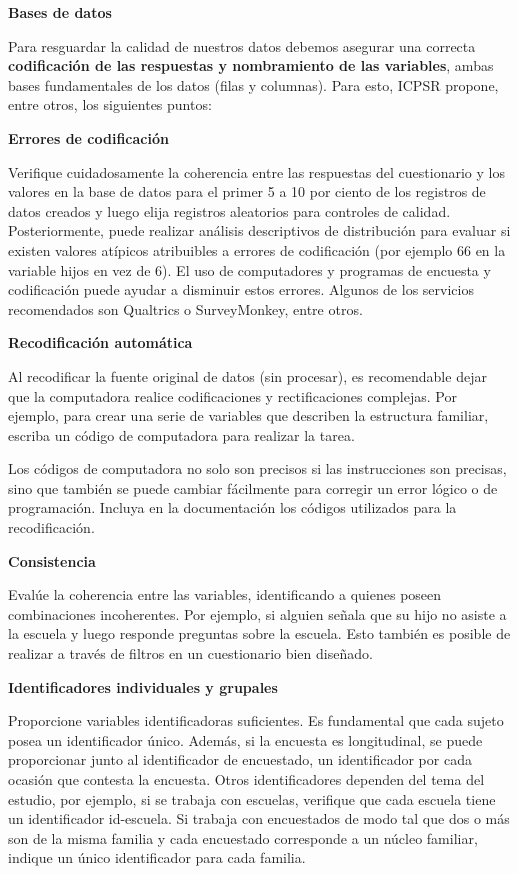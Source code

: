 \documentclass[
  spanish,
  letterpaper,
  DIV=11,
  numbers=noendperiod]{scrreprt}
\begin{document}
\textbf{Bases de datos}

Para resguardar la calidad de nuestros datos debemos asegurar una
correcta \textbf{codificación de las respuestas y nombramiento de las
variables}, ambas bases fundamentales de los datos (filas y columnas).
Para esto, ICPSR propone, entre otros, los siguientes puntos:

\textbf{Errores de codificación}

Verifique cuidadosamente la coherencia entre las respuestas del
cuestionario y los valores en la base de datos para el primer 5 a 10 por
ciento de los registros de datos creados y luego elija registros
aleatorios para controles de calidad. Posteriormente, puede realizar
análisis descriptivos de distribución para evaluar si existen valores
atípicos atribuibles a errores de codificación (por ejemplo 66 en la
variable hijos en vez de 6). El uso de computadores y programas de
encuesta y codificación puede ayudar a disminuir estos errores. Algunos
de los servicios recomendados son Qualtrics o SurveyMonkey, entre otros.

\textbf{Recodificación automática}

Al recodificar la fuente original de datos (sin procesar), es
recomendable dejar que la computadora realice codificaciones y
rectificaciones complejas. Por ejemplo, para crear una serie de
variables que describen la estructura familiar, escriba un código de
computadora para realizar la tarea.

Los códigos de computadora no solo son precisos si las instrucciones son
precisas, sino que también se puede cambiar fácilmente para corregir un
error lógico o de programación. Incluya en la documentación los códigos
utilizados para la recodificación.

\textbf{Consistencia}

Evalúe la coherencia entre las variables, identificando a quienes poseen
combinaciones incoherentes. Por ejemplo, si alguien señala que su hijo
no asiste a la escuela y luego responde preguntas sobre la escuela. Esto
también es posible de realizar a través de filtros en un cuestionario
bien diseñado.

\textbf{Identificadores individuales y grupales}

Proporcione variables identificadoras suficientes. Es fundamental que
cada sujeto posea un identificador único. Además, si la encuesta es
longitudinal, se puede proporcionar junto al identificador de
encuestado, un identificador por cada ocasión que contesta la encuesta.
Otros identificadores dependen del tema del estudio, por ejemplo, si se
trabaja con escuelas, verifique que cada escuela tiene un identificador
id-escuela. Si trabaja con encuestados de modo tal que dos o más son de
la misma familia y cada encuestado corresponde a un núcleo familiar,
indique un único identificador para cada familia.
\end{document}
